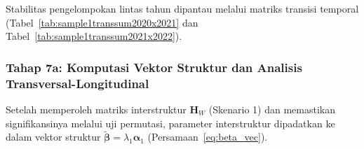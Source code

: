 Stabilitas pengelompokan lintas tahun dipantau melalui matriks transisi temporal (Tabel~\ref{tab:sample1transsum2020x2021} dan Tabel~\ref{tab:sample1transsum2021x2022}).



\subsubsection{Tahap 7a: Komputasi Vektor Struktur dan Analisis Transversal-Longitudinal}
Setelah memperoleh matriks interstruktur $\mathbf{H}_W$ (Skenario 1) dan memastikan signifikansinya melalui uji permutasi, parameter interstruktur dipadatkan ke dalam vektor struktur $\tilde{\boldsymbol{\beta}} = \lambda_1 \boldsymbol{\alpha}_1$ (Persamaan~\ref{eq:beta_vec}). 


